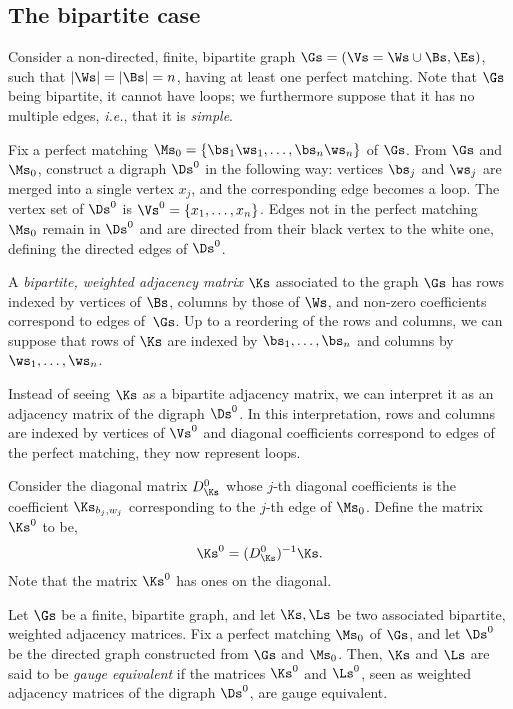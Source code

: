 \documentclass[a4paper,twoside,11pt]{article}
\begin{document}
\subsection{The bipartite case}\label{sec2:app}


Consider a non-directed, finite, bipartite graph $\Gs=(\Vs=\Ws\cup\Bs,\Es)$, such that $|\Ws|=|\Bs|=n$, having at least one perfect matching.
Note that $\Gs$ being bipartite, it cannot have loops; we furthermore suppose that it has no multiple edges, \emph{i.e.},
that it is \emph{simple}.

Fix a perfect matching $\Ms_0=\{\bs_1\ws_1,\dots,\bs_n\ws_n\}$ of $\Gs$. From $\Gs$ and $\Ms_0$, construct a digraph 
$\Ds^0$ in the following way: vertices $\bs_j$ and $\ws_j$ are 
merged into a single vertex $x_j$, and the corresponding edge becomes a loop. The vertex set of $\Ds^0$ is $\Vs^0=\{x_1,\dots,x_n\}$.
Edges not in the perfect matching $\Ms_0$ remain in $\Ds^0$ and are directed from their black vertex to the white one, defining the 
directed edges of $\Ds^0$. 

A \emph{bipartite, weighted adjacency matrix} $\Ks$ associated to the graph $\Gs$ has rows indexed by vertices of $\Bs$, 
columns by those of $\Ws$, and non-zero
coefficients correspond to edges of~$\Gs$. Up to a reordering of the rows and columns, we can suppose that rows of 
$\Ks$ are indexed by $\bs_1,\dots,\bs_n$ and 
columns by $\ws_1,\dots,\ws_n$. 

Instead of seeing $\Ks$ as a bipartite adjacency matrix, we can interpret it as an adjacency matrix of the digraph $\Ds^0$.
In this interpretation, rows and columns are indexed by vertices of $\Vs^0$ and diagonal coefficients correspond to edges 
of the perfect matching, they now represent loops.

Consider the diagonal matrix $D_\Ks^{0}$ whose $j$-th diagonal coefficients is the coefficient $\Ks_{b_j,w_j}$ corresponding to 
the $j$-th edge of $\Ms_0$. Define the matrix 
$\Ks^0$ to be,
\begin{equation*}
\Ks^0=(D_\Ks^0)^{-1}\Ks. 
\end{equation*}
Note that the matrix $\Ks^0$ has ones on the diagonal.

\begin{defi}\label{def:gauge_bip}
Let $\Gs$ be a finite, bipartite graph, and let $\Ks,\Ls$ be two associated bipartite, weighted adjacency matrices.
Fix a perfect matching $\Ms_0$ of $\Gs$, and let $\Ds^0$ be the directed 
graph constructed from $\Gs$ and $\Ms_0$. 
Then, $\Ks$ and $\Ls$ are said to be \emph{gauge equivalent} if the matrices $\Ks^0$ and $\Ls^0$, 
seen as weighted adjacency matrices of the digraph $\Ds^0$, are gauge equivalent.
\end{defi}
\end{document}
